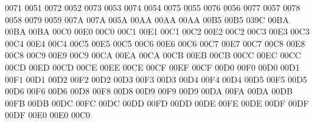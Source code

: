  0071 0051 %
 0072 0052 %
 0073 0053 %
 0074 0054 %
 0075 0055 %
 0076 0056 %
 0077 0057 %
 0078 0058 %
 0079 0059 %
\setcclcuc 007A 007A 005A %
\setcclcuc 00AA 00AA 00AA %
\setcclcuc 00B5 00B5 039C %
\setcclcuc 00BA 00BA 00BA %
\setcclcuc 00C0 00E0 00C0 %
\setcclcuc 00C1 00E1 00C1 %
\setcclcuc 00C2 00E2 00C2 %
\setcclcuc 00C3 00E3 00C3 %
\setcclcuc 00C4 00E4 00C4 %
\setcclcuc 00C5 00E5 00C5 %
\setcclcuc 00C6 00E6 00C6 %
\setcclcuc 00C7 00E7 00C7 %
\setcclcuc 00C8 00E8 00C8 %
\setcclcuc 00C9 00E9 00C9 %
\setcclcuc 00CA 00EA 00CA %
\setcclcuc 00CB 00EB 00CB %
\setcclcuc 00CC 00EC 00CC %
\setcclcuc 00CD 00ED 00CD %
\setcclcuc 00CE 00EE 00CE %
\setcclcuc 00CF 00EF 00CF %
\setcclcuc 00D0 00F0 00D0 %
\setcclcuc 00D1 00F1 00D1 %
\setcclcuc 00D2 00F2 00D2 %
\setcclcuc 00D3 00F3 00D3 %
\setcclcuc 00D4 00F4 00D4 %
\setcclcuc 00D5 00F5 00D5 %
\setcclcuc 00D6 00F6 00D6 %
\setcclcuc 00D8 00F8 00D8 %
\setcclcuc 00D9 00F9 00D9 %
\setcclcuc 00DA 00FA 00DA %
\setcclcuc 00DB 00FB 00DB %
\setcclcuc 00DC 00FC 00DC %
\setcclcuc 00DD 00FD 00DD %
\setcclcuc 00DE 00FE 00DE %
\setcclcuc 00DF 00DF 00DF %
\setcclcuc 00E0 00E0 00C0 %
